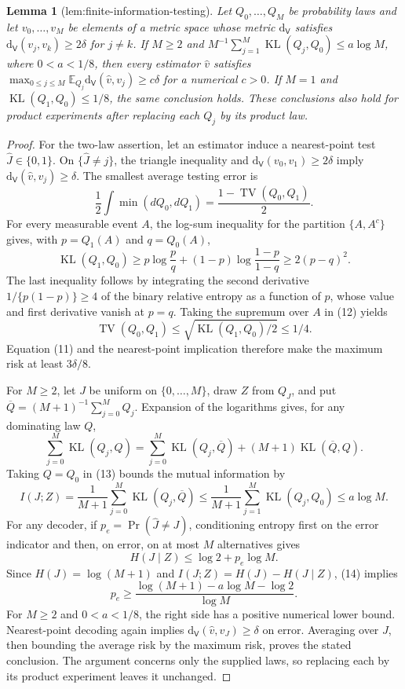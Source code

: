\documentclass{article}
\newtheorem{lemma}{Lemma}
\begin{document}
\begin{lemma}[lem:finite-information-testing]\label{lem:finite-information-testing}
Let \(Q_0,\ldots,Q_M\) be probability laws and let \(v_0,\ldots,v_M\) be elements of a metric space whose metric \(\mathrm d_{\mathsf V}\) satisfies \(\mathrm d_{\mathsf V}(v_j,v_k)\ge 2\delta\) for \(j\ne k\). If \(M\ge2\) and \(M^{-1}\sum_{j=1}^M\operatorname{KL}(Q_j,Q_0)\le a\log M\), where \(0<a<1/8\), then every estimator \(\widehat v\) satisfies \(\max_{0\le j\le M}\mathbb E_{Q_j}\mathrm d_{\mathsf V}(\widehat v,v_j)\ge c\delta\) for a numerical \(c>0\). If \(M=1\) and \(\operatorname{KL}(Q_1,Q_0)\le1/8\), the same conclusion holds. These conclusions also hold for product experiments after replacing each \(Q_j\) by its product law.
\end{lemma}
\begin{proof}
For the two-law assertion, let an estimator induce a nearest-point test \(\widehat J\in\{0,1\}\). On \(\{\widehat J\ne j\}\), the triangle inequality and \(\mathrm d_{\mathsf V}(v_0,v_1)\ge2\delta\) imply \(\mathrm d_{\mathsf V}(\widehat v,v_j)\ge\delta\). The smallest average testing error is
\[
 \frac12\int \min(dQ_0,dQ_1)=\frac{1-\operatorname{TV}(Q_0,Q_1)}2. \tag{11}
\]
For every measurable event \(A\), the log-sum inequality for the partition \(\{A,A^c\}\) gives, with \(p=Q_1(A)\) and \(q=Q_0(A)\),
\[
 \operatorname{KL}(Q_1,Q_0)
 \ge p\log\frac pq+(1-p)\log\frac{1-p}{1-q}
 \ge2(p-q)^2. \tag{12}
\]
The last inequality follows by integrating the second derivative \(1/\{p(1-p)\}\ge4\) of the binary relative entropy as a function of \(p\), whose value and first derivative vanish at \(p=q\). Taking the supremum over \(A\) in (12) yields
\[
 \operatorname{TV}(Q_0,Q_1)\le\sqrt{\operatorname{KL}(Q_1,Q_0)/2}\le1/4.
\]
Equation (11) and the nearest-point implication therefore make the maximum risk at least \(3\delta/8\).

For \(M\ge2\), let \(J\) be uniform on \(\{0,\ldots,M\}\), draw \(Z\) from \(Q_J\), and put \(\overline Q=(M+1)^{-1}\sum_{j=0}^M Q_j\). Expansion of the logarithms gives, for any dominating law \(Q\),
\[
 \sum_{j=0}^M\operatorname{KL}(Q_j,Q)
 =\sum_{j=0}^M\operatorname{KL}(Q_j,\overline Q)
 +(M+1)\operatorname{KL}(\overline Q,Q). \tag{13}
\]
Taking \(Q=Q_0\) in (13) bounds the mutual information by
\[
 I(J;Z)=\frac1{M+1}\sum_{j=0}^M\operatorname{KL}(Q_j,\overline Q)
 \le\frac1{M+1}\sum_{j=1}^M\operatorname{KL}(Q_j,Q_0)
 \le a\log M. \tag{14}
\]
For any decoder, if \(p_e=\Pr(\widehat J\ne J)\), conditioning entropy first on the error indicator and then, on error, on at most \(M\) alternatives gives
\[
 H(J\mid Z)\le\log2+p_e\log M.
\]
Since \(H(J)=\log(M+1)\) and \(I(J;Z)=H(J)-H(J\mid Z)\), (14) implies
\[
 p_e\ge
 \frac{\log(M+1)-a\log M-\log2}{\log M}. \tag{15}
\]
For \(M\ge2\) and \(0<a<1/8\), the right side has a positive numerical lower bound. Nearest-point decoding again implies \(\mathrm d_{\mathsf V}(\widehat v,v_J)\ge\delta\) on error. Averaging over \(J\), then bounding the average risk by the maximum risk, proves the stated conclusion. The argument concerns only the supplied laws, so replacing each by its product experiment leaves it unchanged.
\end{proof}
\end{document}
